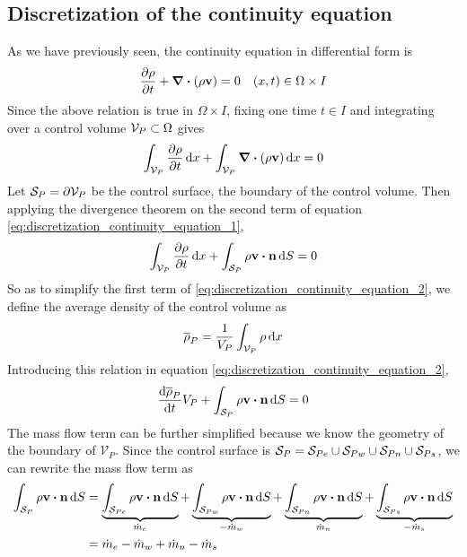 
\subsection{Discretization of the continuity equation}

As we have previously seen, the continuity equation in differential form is
\begin{equation}
	\pdv{\rho}{t} + \div(\rho \vb{v}) = 0 \quad (x,t) \in \Omega \times I
\end{equation}
Since the above relation is true in $\Omega \times I$, fixing one time $t \in I$
and integrating over a control volume $\mathcal{V}_{P} \subset \Omega$ gives
\begin{equation} \label{eq:discretization_continuity_equation_1}
	\int_{\mathcal{V}_{P}} \pdv{\rho}{t} \dd{x} + \int_{\mathcal{V}_{P}} \div(\rho \vb{v}) \dd{x} = 0
\end{equation}
Let $\mathcal{S}_{P} = \partial \mathcal{V}_{P}$ be the control surface, \ie the boundary of the
control volume. Then applying the divergence theorem on the second term of
equation \eqref{eq:discretization_continuity_equation_1},
\begin{equation} \label{eq:discretization_continuity_equation_2}
	\int_{\cv{P}} \pdv{\rho}{t} \dd{x} + 
	\int_{\cs{P}} \rho \vb{v} \vdot \vb{n} \dd{S} = 0
\end{equation}
So as to simplify the first term of
\eqref{eq:discretization_continuity_equation_2}, we define the average density of the
control volume as
\begin{equation}
	\overline{\rho}_P = \frac{1}{V_P} \int_{\mathcal{V}_{P}} \rho \dd{x}
\end{equation}
Introducing this relation in equation
\eqref{eq:discretization_continuity_equation_2},
\begin{equation} \label{eq:discretization_continuity_equation_3}
	\frac{\dd \overline{\rho}_P}{\dd{t}} V_P + 
	\int_{\cs{P}} \rho \vb{v} \vdot \vb{n} \dd{S} = 0
\end{equation}
The mass flow term can be further simplified because we know the geometry of the
boundary of $\mathcal{V}_P$. Since the control surface is $\mathcal{S}_{P} = \mathcal{S}_{Pe} \cup
\mathcal{S}_{Pw} \cup \mathcal{S}_{Pn} \cup \mathcal{S}_{Ps}$, we can rewrite the mass flow term as
\begin{align}
	\int_{\cs{P}} \rho \vb{v} \vdot \vb{n} \dd{S} 
	&= 
	\underbrace{\int_{\cs{Pe}} \rho \vb{v} \vdot \vb{n} \dd{S}}_{\dot{m}_e}
	+ \underbrace{\int_{\cs{Pw}} \rho \vb{v} \vdot \vb{n} \dd{S}}_{-\dot{m}_w}
	+ \underbrace{\int_{\cs{Pn}} \rho \vb{v} \vdot \vb{n} \dd{S}}_{\dot{m}_n}
	+ \underbrace{\int_{\cs{Ps}} \rho \vb{v} \vdot \vb{n} \dd{S}}_{-\dot{m}_s} \nonumber \\
	&= \dot{m}_e - \dot{m}_w + \dot{m}_n - \dot{m}_s \label{eq:discretization_continuity_equation_7}
\end{align}
